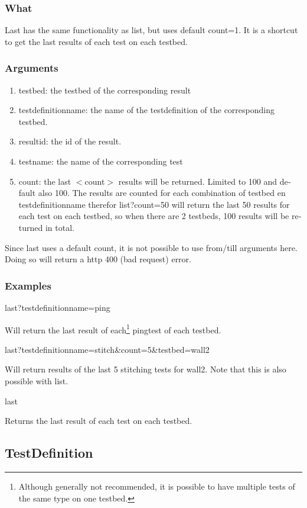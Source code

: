 \begin{otherlanguage}{english}
\subsubsection{What}
Last has the same functionality as list, but uses default count=1. It is a shortcut to get the last results of each test on each testbed.
\subsubsection{Arguments}
\begin{enumerate}
\item testbed: the testbed of the corresponding result
\item testdefinitionname: the name of the testdefinition of the corresponding testbed.
\item resultid: the id of the result.
\item testname: the name of the corresponding test
\item count: the last $<$count$>$ results will be returned. Limited to 100 and default also 100. The results are counted for each combination of testbed en testdefinitionname therefor list?count=50 will return the last 50 results for each test on each testbed, so when there are 2 testbeds, 100 results will be returned in total.
\end{enumerate}
\npar
Since last uses a default count, it is not possible to use from/till arguments here. Doing so will return a http 400 (bad request) error.
\subsubsection{Examples}
\begin{lt}
last?testdefinitionname=ping
\end{lt}
Will return the last result of each\footnote{Although generally not recommended, it is possible to have multiple tests of the same type on one testbed.} pingtest of each testbed.
\npar
\begin{lt}
last?testdefinitionname=stitch&count=5&testbed=wall2
\end{lt}
Will return results of the last 5 stitching tests for wall2. Note that this is also possible with list.
\npar
\begin{lt}
last
\end{lt}
Returns the last result of each test on each testbed.
\clearpage
\subsection{TestDefinition}

\end{otherlanguage}
